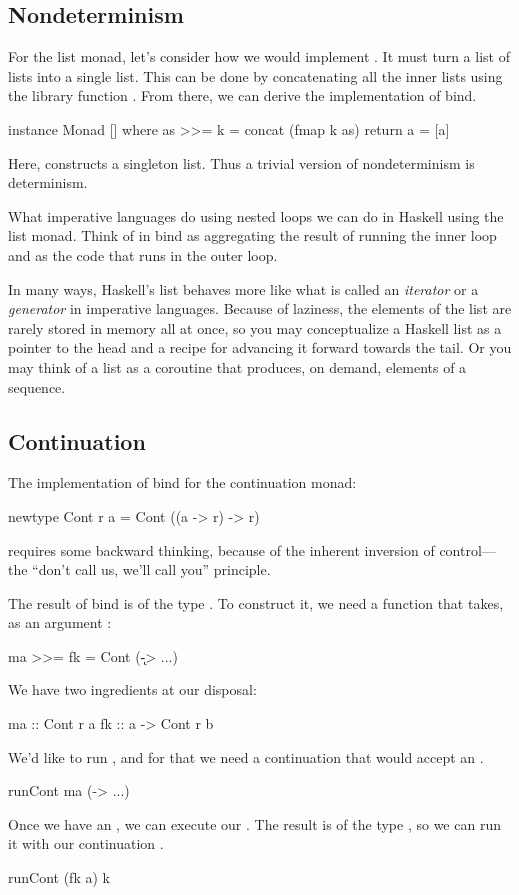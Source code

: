 \documentclass[DaoFP]{subfiles}
\begin{document}
\subsection{Nondeterminism}

For the list monad, let's consider how we would implement . It must turn a list of lists into a single list. This can be done by concatenating all the inner lists using the library function . From there, we can derive the implementation of bind.
\begin{haskell}
instance Monad [] where
  as >>= k = concat (fmap k as)
  return a = [a]
\end{haskell}
Here,  constructs a singleton list. Thus a trivial version of nondeterminism is determinism.

What imperative languages do using nested loops we can do in Haskell using the list monad. Think of  in bind as aggregating the result of running the inner loop and  as the code that runs in the outer loop. 

In many ways, Haskell's list behaves more like what is called an \emph{iterator} or a \emph{generator} in imperative languages. Because of laziness, the elements of the list are rarely stored in memory all at once, so you may conceptualize a Haskell list as a pointer to the head and a recipe for advancing it forward towards the tail. Or you may think of a list as a coroutine that produces, on demand, elements of a sequence.

\subsection{Continuation}

The implementation of bind for the continuation monad:

\begin{haskell}
newtype Cont r a = Cont ((a -> r) -> r)
\end{haskell}
requires some backward thinking, because of the inherent inversion of control---the ``don't call us, we'll call you'' principle. 

The result of bind is of the type . To construct it, we need a function that takes, as an argument :
\begin{haskell}
ma >>= fk = Cont (\k -> ...)
\end{haskell}
We have two ingredients at our disposal: 
\begin{haskell}
ma :: Cont r a
fk :: a -> Cont r b
\end{haskell}
We'd like to run , and for that we need a continuation that would accept an .
\begin{haskell}
runCont ma (\a -> ...)
\end{haskell}
Once we have an , we can execute our . The result is of the type , so we can run it with our continuation . 
\begin{haskell}
runCont (fk a) k
\end{haskell}
\end{document}
